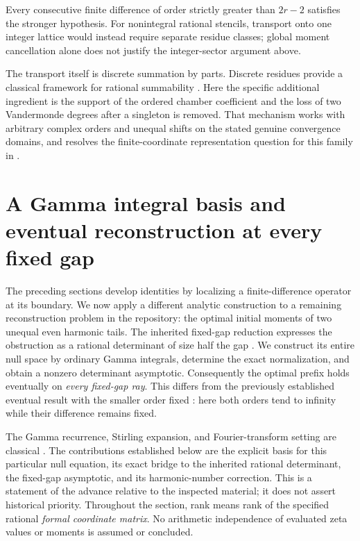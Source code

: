 \documentclass[11pt,a4paper]{article}
\numberwithin{equation}{section}
\theoremstyle{definition}
\theoremstyle{remark}
\begin{document}
Every consecutive finite difference of order strictly greater than
$2r-2$ satisfies the stronger hypothesis.  For nonintegral rational
stencils, transport onto one integer lattice would instead require
separate residue classes; global moment cancellation alone does not
justify the integer-sector argument above.

The transport itself is discrete summation by parts.  Discrete residues
provide a classical framework for rational summability
\cite{chen-singer}.  Here the specific additional ingredient is the
support of the ordered chamber coefficient and the loss of two
Vandermonde degrees after a singleton is removed.  That mechanism works
with arbitrary complex orders and unequal shifts on the stated genuine
convergence domains, and resolves the finite-coordinate representation
question for this family in \cite{repo:finite}.

\section{A Gamma integral basis and eventual reconstruction at every fixed gap}
\label{gb:section}

The preceding sections develop identities by localizing a finite-difference
operator at its boundary.  We now apply a different analytic construction
to a remaining reconstruction problem in the repository: the optimal
initial moments of two unequal even harmonic tails.  The inherited
fixed-gap reduction expresses the obstruction as a rational determinant
of size half the gap \cite{repo-gamma}.  We construct its entire null
space by ordinary Gamma integrals, determine the exact normalization,
and obtain a nonzero determinant asymptotic.  Consequently the optimal
prefix holds eventually on \emph{every fixed-gap ray}.  This differs from
the previously established eventual result with the smaller order fixed
\cite{repo:quartic}:
here both orders tend to infinity while their difference remains fixed.

The Gamma recurrence, Stirling expansion, and Fourier-transform setting
are classical \cite{dlmf:gamma,dlmf-stirling,ramanujan-transform}.
The contributions established below are the explicit basis for this
particular null equation, its exact bridge to the inherited rational
determinant, the fixed-gap asymptotic, and its harmonic-number correction.
This is a statement of the advance relative to the inspected material;
it does not assert historical priority.  Throughout the section, rank
means rank of the specified rational \emph{formal coordinate matrix}.
No arithmetic independence of evaluated zeta values or moments is
assumed or concluded.
\end{document}
